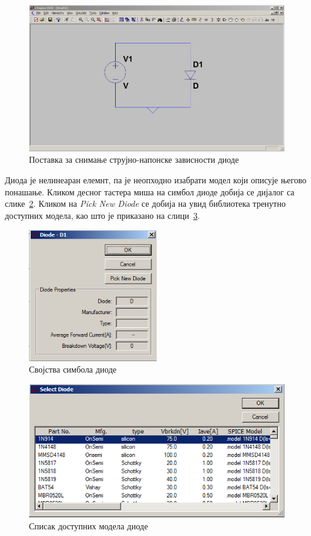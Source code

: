 \begin{figure}[h]
\centering
\includegraphics[width=\figwidth\textwidth]{figs/d-dc1.PNG}
\caption{Поставка за снимање струјно-напонске зависности диоде}
\label{Fig:d-dc1}
\end{figure}

Диода је нелинеаран елемнт, па је неопходно изабрати модел који описује његово понашање. Кликом десног тастера миша на симбол диоде добија се дијалог са слике~\ref{Fig:d-dc2}. Кликом на \textit{Pick New Diode} се добија на увид библиотека тренутно доступних модела, као што је приказано на слици~\ref{Fig:d-dc3}.

\begin{figure}[h]
\centering
\includegraphics[width=0.5\textwidth]{figs/d-dc2.PNG}
\caption{Својства симбола диоде}
\label{Fig:d-dc2}
\end{figure}

\begin{figure}[h]
\centering
\includegraphics[width=\figwidth\textwidth]{figs/d-dc3.PNG}
\caption{Списак доступних модела диоде}
\label{Fig:d-dc3}
\end{figure}

